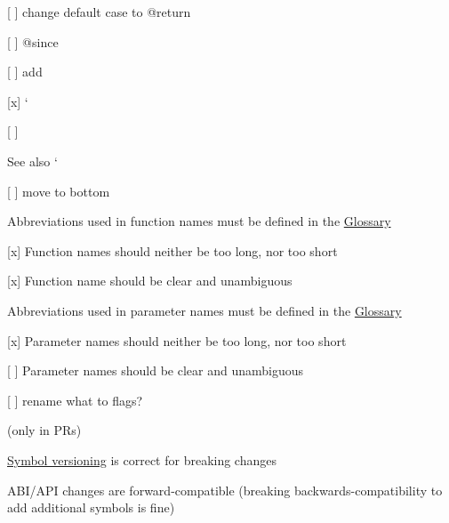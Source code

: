 \begin{DoxyItemize}
\begin{DoxyItemize}
\item \mbox{[} \mbox{]} change default case to {\ttfamily @return}
\end{DoxyItemize}
\item \mbox{[} \mbox{]} {\ttfamily @since}
\begin{DoxyItemize}
\item \mbox{[} \mbox{]} add
\end{DoxyItemize}
\item \mbox{[}x\mbox{]} `{\ttfamily }
\item {\ttfamily \mbox{[} \mbox{]}}\begin{DoxySeeAlso}{See also}
`
\begin{DoxyItemize}
\item \mbox{[} \mbox{]} move to bottom
\end{DoxyItemize}
\end{DoxySeeAlso}

\end{DoxyItemize}


\begin{DoxyItemize}
\item Abbreviations used in function names must be defined in the \hyperlink{doc_help_elektra-glossary_md}{Glossary}
\item \mbox{[}x\mbox{]} Function names should neither be too long, nor too short
\item \mbox{[}x\mbox{]} Function name should be clear and unambiguous
\item Abbreviations used in parameter names must be defined in the \hyperlink{doc_help_elektra-glossary_md}{Glossary}
\item \mbox{[}x\mbox{]} Parameter names should neither be too long, nor too short
\item \mbox{[} \mbox{]} Parameter names should be clear and unambiguous
\begin{DoxyItemize}
\item \mbox{[} \mbox{]} rename what to flags?
\end{DoxyItemize}
\end{DoxyItemize}

(only in P\+Rs)


\begin{DoxyItemize}
\item \hyperlink{doc_dev_symbol-versioning_md}{Symbol versioning} is correct for breaking changes
\item A\+B\+I/\+A\+PI changes are forward-\/compatible (breaking backwards-\/compatibility to add additional symbols is fine)
\end{DoxyItemize}


